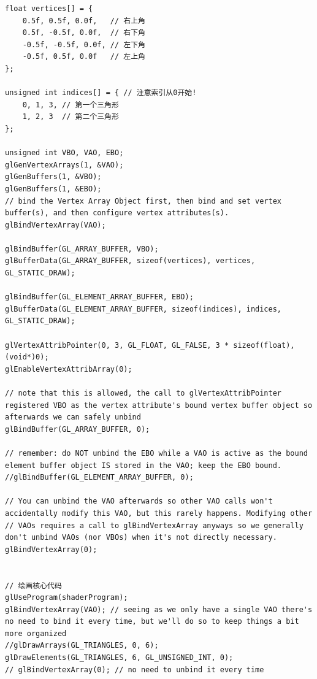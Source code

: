 \documentclass[UTF8,a4paper,12pt]{ctexbook}
\begin{document}
			\begin{lstlisting}
float vertices[] = {
    0.5f, 0.5f, 0.0f,   // 右上角
    0.5f, -0.5f, 0.0f,  // 右下角
    -0.5f, -0.5f, 0.0f, // 左下角
    -0.5f, 0.5f, 0.0f   // 左上角
};

unsigned int indices[] = { // 注意索引从0开始! 
    0, 1, 3, // 第一个三角形
    1, 2, 3  // 第二个三角形
};			
						
unsigned int VBO, VAO, EBO;
glGenVertexArrays(1, &VAO);
glGenBuffers(1, &VBO);
glGenBuffers(1, &EBO);
// bind the Vertex Array Object first, then bind and set vertex buffer(s), and then configure vertex attributes(s).
glBindVertexArray(VAO);

glBindBuffer(GL_ARRAY_BUFFER, VBO);
glBufferData(GL_ARRAY_BUFFER, sizeof(vertices), vertices, GL_STATIC_DRAW);

glBindBuffer(GL_ELEMENT_ARRAY_BUFFER, EBO);
glBufferData(GL_ELEMENT_ARRAY_BUFFER, sizeof(indices), indices, GL_STATIC_DRAW);

glVertexAttribPointer(0, 3, GL_FLOAT, GL_FALSE, 3 * sizeof(float), (void*)0);
glEnableVertexAttribArray(0);

// note that this is allowed, the call to glVertexAttribPointer registered VBO as the vertex attribute's bound vertex buffer object so afterwards we can safely unbind
glBindBuffer(GL_ARRAY_BUFFER, 0); 

// remember: do NOT unbind the EBO while a VAO is active as the bound element buffer object IS stored in the VAO; keep the EBO bound.
//glBindBuffer(GL_ELEMENT_ARRAY_BUFFER, 0);

// You can unbind the VAO afterwards so other VAO calls won't accidentally modify this VAO, but this rarely happens. Modifying other
// VAOs requires a call to glBindVertexArray anyways so we generally don't unbind VAOs (nor VBOs) when it's not directly necessary.
glBindVertexArray(0); 


// 绘画核心代码
glUseProgram(shaderProgram);
glBindVertexArray(VAO); // seeing as we only have a single VAO there's no need to bind it every time, but we'll do so to keep things a bit more organized
//glDrawArrays(GL_TRIANGLES, 0, 6);
glDrawElements(GL_TRIANGLES, 6, GL_UNSIGNED_INT, 0);
// glBindVertexArray(0); // no need to unbind it every time 
			\end{lstlisting}
				
\end{document}
